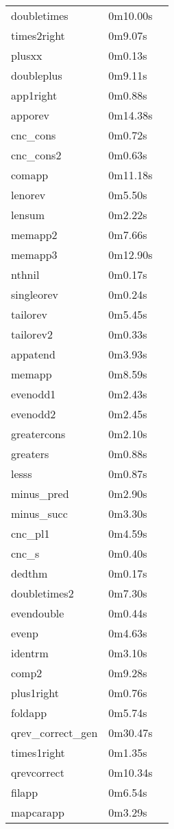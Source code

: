 \begin{center}
\begin{supertabular}[t]{llp{2in}}
doubletimes & 0m10.00s & \\
times2right & 0m9.07s & \\
plusxx & 0m0.13s & \\
doubleplus & 0m9.11s & \\
app1right & 0m0.88s & \\
apporev & 0m14.38s & \\
cnc\_cons & 0m0.72s & \\
cnc\_cons2 & 0m0.63s & \\
comapp & 0m11.18s & \\
lenorev & 0m5.50s & \\
lensum & 0m2.22s & \\
memapp2 & 0m7.66s & \\
memapp3 & 0m12.90s & \\
nthnil & 0m0.17s & \\
singleorev & 0m0.24s & \\
tailorev & 0m5.45s & \\
tailorev2 & 0m0.33s & \\
appatend & 0m3.93s & \\
memapp & 0m8.59s & \\
evenodd1 & 0m2.43s & \\
evenodd2 & 0m2.45s & \\
greatercons & 0m2.10s & \\
greaters & 0m0.88s & \\
lesss & 0m0.87s & \\
minus\_pred & 0m2.90s & \\
minus\_succ & 0m3.30s & \\
cnc\_pl1 & 0m4.59s & \\
cnc\_s & 0m0.40s & \\
dedthm & 0m0.17s & \\
doubletimes2 & 0m7.30s & \\
evendouble & 0m0.44s & \\
evenp & 0m4.63s & \\
identrm & 0m3.10s & \\
comp2 & 0m9.28s & \\
plus1right & 0m0.76s & \\
foldapp & 0m5.74s & \\
qrev\_correct\_gen & 0m30.47s & \\
times1right & 0m1.35s & \\
qrevcorrect & 0m10.34s & \\
filapp & 0m6.54s & \\
mapcarapp & 0m3.29s & \\

\end{supertabular}
\end{center}
